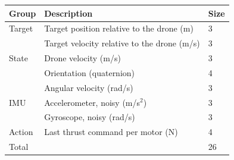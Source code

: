 \centering
\begin{tabular}{lll}
  \toprule
  Group    & Description                                 & Size \\
  \midrule
  Target   & Target position relative to the drone (m)   & 3 \\
           & Target velocity relative to the drone (m/s) & 3 \\
  State    & Drone velocity (m/s)                        & 3 \\
           & Orientation (quaternion)                    & 4 \\
           & Angular velocity (rad/s)                    & 3 \\
  IMU      & Accelerometer, noisy (m/s$^2$)              & 3 \\
           & Gyroscope, noisy (rad/s)                    & 3 \\
  Action   & Last thrust command per motor (N)           & 4 \\
  \midrule
  Total    &                                             & 26 \\
  \bottomrule
\end{tabular}